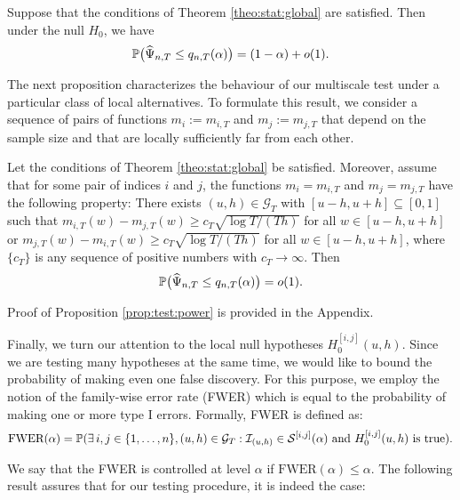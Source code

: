 \documentclass[a4paper,12pt]{article}
\begin{document}
\begin{prop}\label{prop:test}
Suppose that the conditions of Theorem \ref{theo:stat:global} are satisfied. Then under the null $H_0$, we have
\[ \mathbb{P} \big( \widehat{\Psi}_{n,T} \le q_{n,T}(\alpha) \big) = (1 - \alpha) + o(1). \]
\end{prop}

The next proposition characterizes the behaviour of our multiscale test under a particular class of local alternatives. To formulate this result, we consider a sequence of pairs of functions $m_ i := m_{i,T}$ and $m_ j := m_{j,T}$ that depend on the sample size and that are locally sufficiently far from each other.

\begin{prop}\label{prop:test:power}
Let the conditions  of Theorem \ref{theo:stat:global} be satisfied. Moreover, assume that for some pair of indices $i$ and $j$, the functions $m_ i = m_{i,T}$ and $m_ j = m_{j,T}$ have the following property: There exists $(u,h) \in \mathcal{G}_T$ with $[u-h,u+h] \subseteq [0,1]$ such that $m_{i,T}(w) - m_{j,T}(w) \ge c_T \sqrt{\log T/(Th)}$ for all $w \in [u-h,u+h]$ or $m_{j,T}(w) - m_{i,T}(w) \ge c_T \sqrt{\log T/(Th)}$ for all $w \in [u-h,u+h]$, where $\{c_T\}$ is any sequence of positive numbers with $c_T \rightarrow \infty$. Then 
\[ \mathbb{P} \big( \widehat{\Psi}_{n,T} \le q_{n,T}(\alpha) \big) = o(1). \]
\end{prop}

Proof of Proposition \ref{prop:test:power} is provided in the Appendix.

Finally, we turn our attention to the local null hypotheses $H_0^{[i, j]}(u, h)$. Since we are testing many hypotheses at the same time, we would like to bound the probability of making even one false discovery. For this purpose, we employ the notion of the family-wise error rate (FWER) which is equal to the probability of making one or more \linebreak type I errors. Formally, FWER is defined as:
\begin{align*} \text{FWER}(\alpha) = \mathbb{P} (\exists \,  i, j \in \{1, \ldots, n \}, (u, h) \in \mathcal{G}_T: \mathcal{I}_{(u, h)} \in \mathcal{S}^{[i, j]}(\alpha) \text{ and } H_0^{[i, j]}(u, h) \text { is true}).
\end{align*}

We say that the FWER is controlled at level $\alpha$ if $\text{FWER}(\alpha) \leq \alpha$. The following result assures that for our testing procedure, it is indeed the case:
\end{document}
